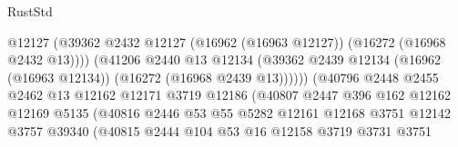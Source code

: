 \begin{lexlean}{RustStd}
\begin{coremodule}
                                            @12127
                                            (@39362
                                              @2432
                                              @12127
                                              (@16962 (@16963 @12127))
                                              (@16272 (@16968 @2432 @13))))
                                          (@41206
                                            @2440
                                            @13
                                            @12134
                                            (@39362
                                              @2439
                                              @12134
                                              (@16962 (@16963 @12134))
                                              (@16272 (@16968 @2439 @13))))))
                                      (@40796
                                        @2448
                                        @2455
                                        @2462
                                        @13
                                        @12162
                                        @12171
                                        @3719
                                        @12186
                                        (@40807
                                          @2447
                                          @396
                                          @162
                                          @12162
                                          @12169
                                          @5135
                                          (@40816
                                            @2446
                                            @53
                                            @55
                                            @5282
                                            @12161
                                            @12168
                                            @3751
                                            @12142
                                            @3757
                                            @39340
                                            (@40815
                                              @2444
                                              @104
                                              @53
                                              @16
                                              @12158
                                              @3719
                                              @3731
                                              @3751

\end{coremodule}
\end{lexlean}
